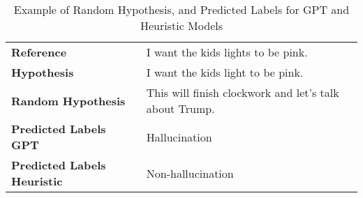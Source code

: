 \begin{table}[ht]
\centering
\tiny
\begin{tabular}{l l}
\hline
\textbf{Reference} & I want the kids lights to be pink. \\ 
\textbf{Hypothesis} & I want the kids light to be pink. \\ 
\textbf{Random Hypothesis} & This will finish clockwork and let's talk about Trump. \\ 
\textbf{Predicted Labels GPT} & Hallucination \\ \textbf{Predicted Labels Heuristic} & Non-hallucination \\ \hline
\end{tabular}
\caption{Example of Random Hypothesis, and Predicted Labels for GPT and Heuristic Models}
\end{table}
